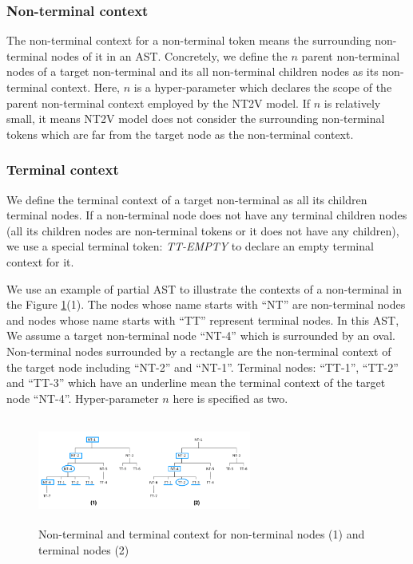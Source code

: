 \documentclass[T, E]{compsoft}
\begin{document}
\subsubsection{Non-terminal context}
The non-terminal context for a non-terminal token means the surrounding non-terminal nodes of it in an AST. 
Concretely, we define the $n$ parent non-terminal nodes of a target non-terminal and its all non-terminal children nodes as its non-terminal context.
Here, $n$ is a hyper-parameter which declares the scope of the parent non-terminal context employed by the NT2V model. 
If $n$ is relatively small, it means NT2V model does not consider the surrounding non-terminal tokens which are far from the target node as the non-terminal context.

\subsubsection{Terminal context} 
We define the terminal context of a target non-terminal as all its children terminal nodes. 
If a non-terminal node does not have any terminal children nodes (all its children nodes are non-terminal tokens or it does not have any children), we use a special terminal token: \textit{TT-EMPTY} to declare an empty terminal context for it.

We use an example of partial AST to illustrate the contexts of a non-terminal in the Figure \ref{fig:node2vec-context}(1). The nodes whose name starts with ``NT'' are non-terminal nodes and nodes whose name starts with ``TT'' represent terminal nodes. 
In this AST, We assume a target non-terminal node ``NT-4'' which is surrounded by an oval. 
Non-terminal nodes surrounded by a rectangle are the non-terminal context of the target node including ``NT-2'' and ``NT-1''. 
Terminal nodes: ``TT-1'', ``TT-2'' and ``TT-3'' which have an underline mean the terminal context of the target node ``NT-4''. 
Hyper-parameter $n$ here is specified as two.


\begin{figure}[!ht]
\centering
\includegraphics[width=7cm, height=3.5cm]{pictures/node2vec_context.png}
\caption{Non-terminal and terminal context for non-terminal nodes (1) and terminal nodes (2)}
\label{fig:node2vec-context}
\end{figure}
\end{document}
